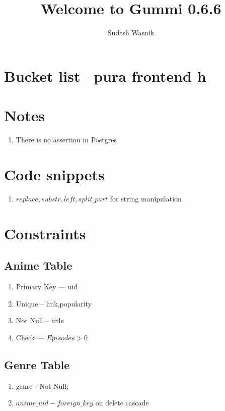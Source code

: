 \documentclass[11pt]{article}
\title{\textbf{Welcome to Gummi 0.6.6}}
\author{Sudesh Wasnik}
\date{}
\begin{document}
\maketitle


\section{Bucket list --pura frontend h}
\begin {enumerate}


\end{enumerate} 	

\section{Notes}
\begin {enumerate}
\item There is no assertion in Postgres
\end{enumerate} 

\section{Code snippets}
\begin {enumerate}
\item $replace, substr, left , split\_part $ for string manipulation
\end{enumerate} 

\section{Constraints}
\subsection{Anime Table}
\begin{enumerate}
\item Primary Key --- uid 
\item Unique -- link,popularity
\item Not Null -- title
\item Check --- $Episodes>0$
\end{enumerate}


\subsection {Genre Table}
\begin{enumerate}
\item genre - Not Null;
\item $anime\_uid - foreign\_key $ on delete cascade
\end{enumerate}
\end{document}
